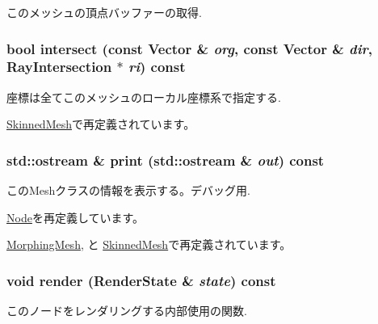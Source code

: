 このメッシュの頂点バッファーの取得. \hypertarget{classm3g_1_1Mesh_dc812d8230f94f0b6b8e4fecdb802a16}{
\subsubsection[{intersect}]{\setlength{\rightskip}{0pt plus 5cm}bool intersect (const {\bf Vector} \& {\em org}, \/  const {\bf Vector} \& {\em dir}, \/  {\bf RayIntersection} $\ast$ {\em ri}) const}}
\label{classm3g_1_1Mesh_dc812d8230f94f0b6b8e4fecdb802a16}


座標は全てこのメッシュのローカル座標系で指定する. 

\hyperlink{classm3g_1_1SkinnedMesh_dc812d8230f94f0b6b8e4fecdb802a16}{SkinnedMesh}で再定義されています。\hypertarget{classm3g_1_1Mesh_6fea17fa1532df3794f8cb39cb4f911f}{
\subsubsection[{print}]{\setlength{\rightskip}{0pt plus 5cm}std::ostream \& print (std::ostream \& {\em out}) const}}
\label{classm3g_1_1Mesh_6fea17fa1532df3794f8cb39cb4f911f}


このMeshクラスの情報を表示する。デバッグ用. 

\hyperlink{classm3g_1_1Node_6fea17fa1532df3794f8cb39cb4f911f}{Node}を再定義しています。

\hyperlink{classm3g_1_1MorphingMesh_6fea17fa1532df3794f8cb39cb4f911f}{MorphingMesh}, と \hyperlink{classm3g_1_1SkinnedMesh_6fea17fa1532df3794f8cb39cb4f911f}{SkinnedMesh}で再定義されています。\hypertarget{classm3g_1_1Mesh_8babc8a79b78615da51161e94029eea9}{
\subsubsection[{render}]{\setlength{\rightskip}{0pt plus 5cm}void render ({\bf RenderState} \& {\em state}) const}}
\label{classm3g_1_1Mesh_8babc8a79b78615da51161e94029eea9}


このノードをレンダリングする内部使用の関数.

